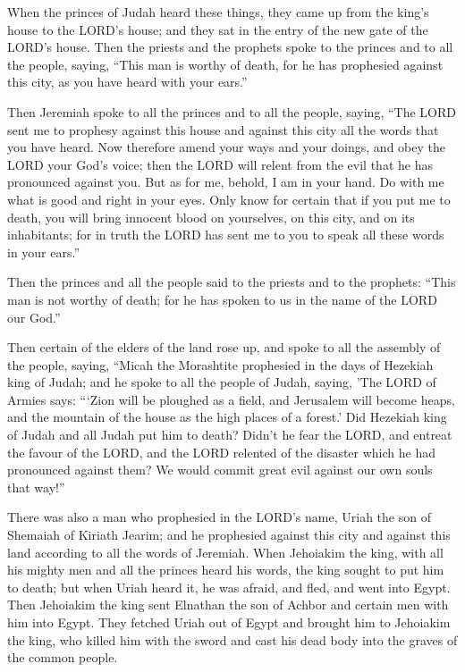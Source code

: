  When the princes of Judah heard these things, they came up
from the king's house to the LORD's house; and they sat in the entry of
the new gate of the LORD's house.  Then the priests and the
prophets spoke to the princes and to all the people, saying, ``This man
is worthy of death, for he has prophesied against this city, as you have
heard with your ears.''

 Then Jeremiah spoke to all the princes and to all the
people, saying, ``The LORD sent me to prophesy against this house and
against this city all the words that you have heard.  Now
therefore amend your ways and your doings, and obey the LORD your God's
voice; then the LORD will relent from the evil that he has pronounced
against you.  But as for me, behold, I am in your hand. Do
with me what is good and right in your eyes.  Only know for
certain that if you put me to death, you will bring innocent blood on
yourselves, on this city, and on its inhabitants; for in truth the LORD
has sent me to you to speak all these words in your ears.''

 Then the princes and all the people said to the priests
and to the prophets: ``This man is not worthy of death; for he has
spoken to us in the name of the LORD our God.''

 Then certain of the elders of the land rose up, and spoke
to all the assembly of the people, saying,  ``Micah the
Morashtite prophesied in the days of Hezekiah king of Judah; and he
spoke to all the people of Judah, saying, 'The LORD of Armies says:
```Zion will be ploughed as a field, and Jerusalem will become heaps,
and the mountain of the house as the high places of a forest.'
 Did Hezekiah king of Judah and all Judah put him to death?
Didn't he fear the LORD, and entreat the favour of the LORD, and the
LORD relented of the disaster which he had pronounced against them? We
would commit great evil against our own souls that way!''

 There was also a man who prophesied in the LORD's name,
Uriah the son of Shemaiah of Kiriath Jearim; and he prophesied against
this city and against this land according to all the words of Jeremiah.
 When Jehoiakim the king, with all his mighty men and all
the princes heard his words, the king sought to put him to death; but
when Uriah heard it, he was afraid, and fled, and went into Egypt.
 Then Jehoiakim the king sent Elnathan the son of Achbor
and certain men with him into Egypt.  They fetched Uriah
out of Egypt and brought him to Jehoiakim the king, who killed him with
the sword and cast his dead body into the graves of the common people.

